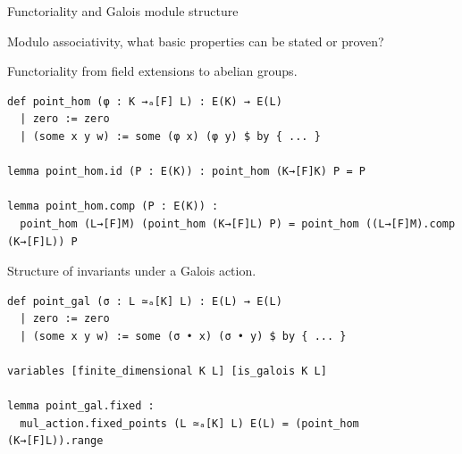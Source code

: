 \documentclass[10pt]{beamer}
\begin{document}
\begin{frame}[fragile, t]{Functoriality and Galois module structure}

Modulo associativity, what basic properties can be stated or proven?

\vspace{0.5cm}

Functoriality from field extensions to abelian groups.

\begin{lstlisting}[basicstyle=\scriptsize, frame=single]
def point_hom (φ : K →ₐ[F] L) : E(K) → E(L)
  | zero := zero
  | (some x y w) := some (φ x) (φ y) $ by { ... }

lemma point_hom.id (P : E(K)) : point_hom (K→[F]K) P = P

lemma point_hom.comp (P : E(K)) :
  point_hom (L→[F]M) (point_hom (K→[F]L) P) = point_hom ((L→[F]M).comp (K→[F]L)) P
\end{lstlisting}

Structure of invariants under a Galois action.

\begin{lstlisting}[basicstyle=\scriptsize, frame=single]
def point_gal (σ : L ≃ₐ[K] L) : E(L) → E(L)
  | zero := zero
  | (some x y w) := some (σ • x) (σ • y) $ by { ... }

variables [finite_dimensional K L] [is_galois K L]

lemma point_gal.fixed :
  mul_action.fixed_points (L ≃ₐ[K] L) E(L) = (point_hom (K→[F]L)).range
\end{lstlisting}

\end{frame}
\end{document}
